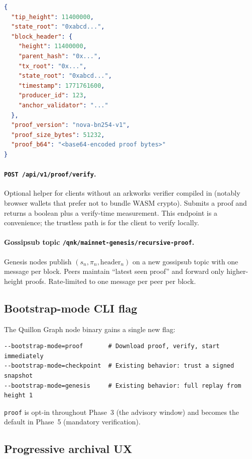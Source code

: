 \documentclass[11pt,a4paper]{article}
\begin{document}
\begin{lstlisting}[language=json,caption={\texttt{GET /api/v1/proof/tip} response body.},label={lst:proof-tip-resp}]
{
  "tip_height": 11400000,
  "state_root": "0xabcd...",
  "block_header": {
    "height": 11400000,
    "parent_hash": "0x...",
    "tx_root": "0x...",
    "state_root": "0xabcd...",
    "timestamp": 1771761600,
    "producer_id": 123,
    "anchor_validator": "..."
  },
  "proof_version": "nova-bn254-v1",
  "proof_size_bytes": 51232,
  "proof_b64": "<base64-encoded proof bytes>"
}
\end{lstlisting}

\paragraph{\texttt{POST /api/v1/proof/verify}.}
Optional helper for clients without an arkworks verifier compiled in
(notably browser wallets that prefer not to bundle WASM crypto).
Submits a proof and returns a boolean plus a verify-time measurement.
This endpoint is a convenience; the trustless path is for the client
to verify locally.

\paragraph{Gossipsub topic \texttt{/qnk/mainnet-genesis/recursive-proof}.}
Genesis nodes publish $(s_n, \pi_n, \mathrm{header}_n)$ on a new
gossipsub topic with one message per block. Peers maintain ``latest
seen proof'' and forward only higher-height proofs. Rate-limited to
one message per peer per block.

\subsection{Bootstrap-mode CLI flag}

The Quillon Graph node binary gains a single new flag:

\begin{lstlisting}
--bootstrap-mode=proof       # Download proof, verify, start immediately
--bootstrap-mode=checkpoint  # Existing behavior: trust a signed snapshot
--bootstrap-mode=genesis     # Existing behavior: full replay from height 1
\end{lstlisting}

\texttt{proof} is opt-in throughout Phase~3 (the advisory window) and
becomes the default in Phase~5 (mandatory verification).

\subsection{Progressive archival UX}
\end{document}
